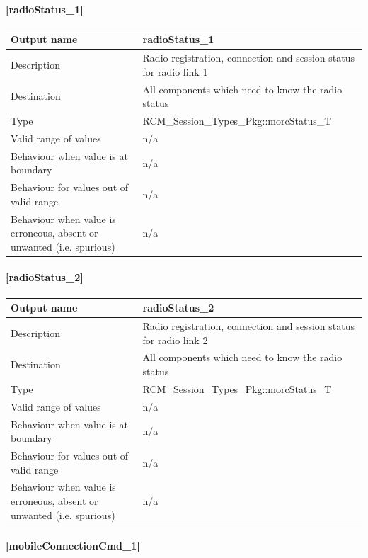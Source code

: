 \paragraph{[radioStatus\_1]}

\begin{longtable}{p{}p{}}
\toprule
Output name				& radioStatus\_1 \\
\midrule
Description				& Radio registration, connection and session status for radio link 1 \\
\midrule
Destination				& All components which need to know the radio status \\ 
\midrule
Type					& RCM\_Session\_Types\_Pkg::morcStatus\_T \\
\midrule
Valid range of values	& n/a \\
\midrule
Behaviour when value is at boundary	& n/a \\
\midrule
Behaviour for values out of valid range	& n/a \\
\midrule
Behaviour when value is erroneous, absent or unwanted (i.e. spurious) & n/a \\
\bottomrule
\end{longtable}

\paragraph{[radioStatus\_2]}

\begin{longtable}{p{}p{}}
	\toprule
	Output name				& radioStatus\_2 \\
	\midrule
	Description				& Radio registration, connection and session status for radio link 2 \\
	\midrule
	Destination				& All components which need to know the radio status \\ 
	\midrule
	Type					& RCM\_Session\_Types\_Pkg::morcStatus\_T \\
	\midrule
	Valid range of values	& n/a \\
	\midrule
	Behaviour when value is at boundary	& n/a \\
	\midrule
	Behaviour for values out of valid range	& n/a \\
	\midrule
	Behaviour when value is erroneous, absent or unwanted (i.e. spurious) & n/a \\
	\bottomrule
\end{longtable}

\paragraph{[mobileConnectionCmd\_1]}

